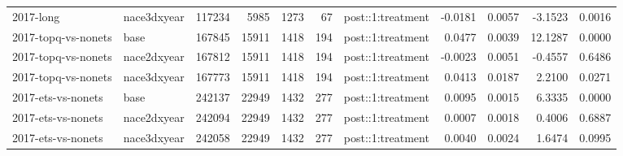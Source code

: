 \begin{table}[ht]
\begin{tabular}{llrrrrlrrrr}
  2017-long & nace3dxyear & 117234 &  5985 &  1273 &    67 & post::1:treatment & -0.0181 & 0.0057 & -3.1523 & 0.0016 \\ 
  2017-topq-vs-nonets & base & 167845 & 15911 &  1418 &   194 & post::1:treatment & 0.0477 & 0.0039 & 12.1287 & 0.0000 \\ 
  2017-topq-vs-nonets & nace2dxyear & 167812 & 15911 &  1418 &   194 & post::1:treatment & -0.0023 & 0.0051 & -0.4557 & 0.6486 \\ 
  2017-topq-vs-nonets & nace3dxyear & 167773 & 15911 &  1418 &   194 & post::1:treatment & 0.0413 & 0.0187 & 2.2100 & 0.0271 \\ 
  2017-ets-vs-nonets & base & 242137 & 22949 &  1432 &   277 & post::1:treatment & 0.0095 & 0.0015 & 6.3335 & 0.0000 \\ 
  2017-ets-vs-nonets & nace2dxyear & 242094 & 22949 &  1432 &   277 & post::1:treatment & 0.0007 & 0.0018 & 0.4006 & 0.6887 \\ 
  2017-ets-vs-nonets & nace3dxyear & 242058 & 22949 &  1432 &   277 & post::1:treatment & 0.0040 & 0.0024 & 1.6474 & 0.0995 \\ 
   \bottomrule
\end{tabular}
\end{table}
